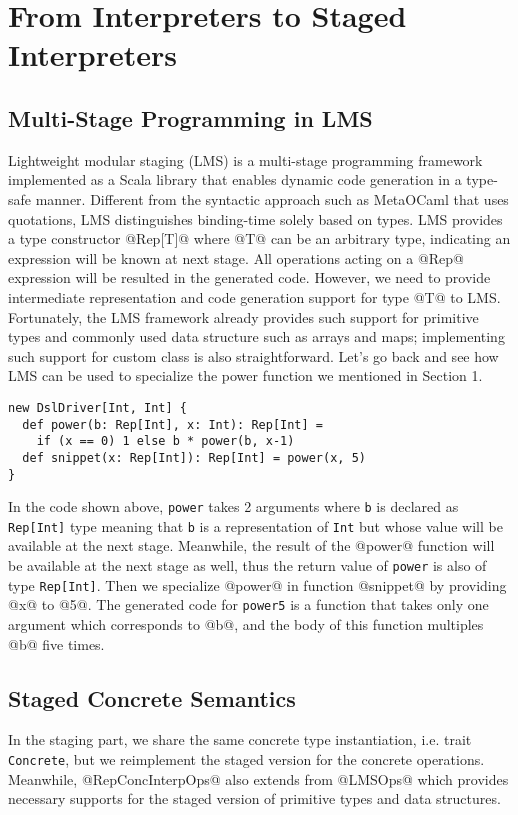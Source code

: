\section{From Interpreters to Staged Interpreters} \label{stagedinterp}

\subsection{Multi-Stage Programming in LMS}
Lightweight modular staging (LMS) \cite{DBLP:conf/gpce/RompfO10} is a multi-stage programming framework implemented 
as a Scala library that enables dynamic code generation in a type-safe manner.
Different from the syntactic approach such as MetaOCaml \cite{DBLP:conf/flops/Kiselyov14} that uses quotations, 
LMS distinguishes binding-time solely based on types.
LMS provides a type constructor @Rep[T]@ where @T@ can be an arbitrary type, indicating an expression will be 
known at next stage. All operations acting on a @Rep@ expression will be resulted in the generated code. However,
we need to provide intermediate representation and code generation support for type @T@ to LMS. 
Fortunately, the LMS framework already provides
such support for primitive types and commonly used data structure such as arrays and maps; implementing such support
for custom class is also straightforward. Let's go back and see how LMS can be used to specialize the power function
we mentioned in Section 1.

\begin{lstlisting}
new DslDriver[Int, Int] {
  def power(b: Rep[Int], x: Int): Rep[Int] =
    if (x == 0) 1 else b * power(b, x-1)
  def snippet(x: Rep[Int]): Rep[Int] = power(x, 5)
}
\end{lstlisting}

In the code shown above, \texttt{power} takes 2 arguments where \texttt{b} is declared as \texttt{Rep[Int]} type 
meaning that \texttt{b} is a representation of \texttt{Int} but whose value will be available at the next stage. 
Meanwhile, the result of the @power@ function will be available at the next stage as well, thus the return value 
of \texttt{power} is also of type \texttt{Rep[Int]}. 
Then we specialize @power@ in function @snippet@ by providing @x@ to @5@.
The generated code for \texttt{power5} is a function that takes only one argument which corresponds to @b@,
and the body of this function multiples @b@ five times.

\subsection{Staged Concrete Semantics} 
In the staging part, we share the same concrete type instantiation, 
i.e. trait \texttt{Concrete}, but we reimplement the staged version for the concrete operations.
Meanwhile, @RepConcInterpOps@ also extends from @LMSOps@ which provides necessary supports for the 
staged version of primitive types and data structures. 

